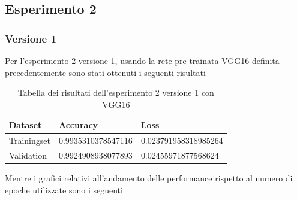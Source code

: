 \subsection{Esperimento 2}

\subsubsection{Versione 1}
Per l'esperimento 2 versione 1, usando la rete pre-trainata VGG16 definita precedentemente sono stati ottenuti i seguenti risultati
\begin{table}[H]
    \begin{tabular}{|l|l|l|}
    \hline
    \textbf{Dataset}     & \textbf{Accuracy}           & \textbf{Loss}                 \\ \hline
    Trainingset & 0.9935310378547116 & 0.023791958318985264 \\ \hline
    Validation  & 0.9924908938077893 & 0.02455971877568624  \\ \hline
    \end{tabular}
   	\caption{\label{tab:esperimento2_v1_risultati}Tabella dei risultati dell'esperimento 2 versione 1 con VGG16}
\end{table}

Mentre i grafici relativi all'andamento delle performance rispetto al numero di epoche utilizzate sono i seguenti

